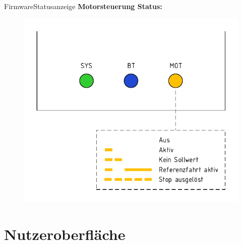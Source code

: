 \documentclass{beamer}
\begin{document}
\begin{frame}{Firmware}{Statusanzeige}
    \textbf{Motorsteuerung Status:}
    \begin{figure}[H]
        \includegraphics[width=.8\textwidth]{./img/Motorstatus.pdf}
    \end{figure}
\end{frame}

\section{Nutzeroberfläche}
\end{document}
